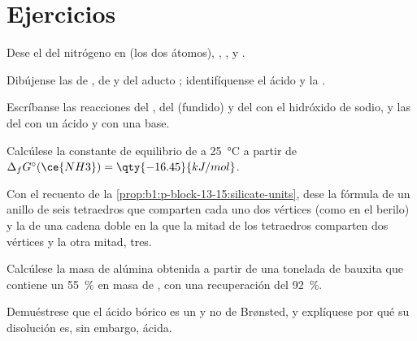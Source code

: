 \section{Ejercicios}

\begin{exercise}[$\star$]\label{exo:b1:p-block-13-15:1}
Dese el  del nitrógeno en  (los dos
átomos), , ,  y .
\end{exercise}

\begin{exercise}[$\star$]\label{exo:b1:p-block-13-15:2}
Dibújense las  de , de  y del aducto
; identifíquense el ácido y la .
\end{exercise}

\begin{exercise}[$\star$]\label{exo:b1:p-block-13-15:3}
Escríbanse las reacciones del , del  (fundido) y del
 con el hidróxido de sodio, y las del  con un ácido y
con una base.
\end{exercise}

\begin{exercise}[$\star$]\label{exo:b1:p-block-13-15:4}
Calcúlese la constante de equilibrio de  a
\qty{25}{\celsius} a partir de $\Delta_f G^\circ(\ce{NH3}) =
\qty{-16.45}{kJ/mol}$.
\end{exercise}

\begin{exercise}[$\star\star$]\label{exo:b1:p-block-13-15:5}
Con el recuento de la \cref{prop:b1:p-block-13-15:silicate-units}, dese
la fórmula de un anillo de seis tetraedros que comparten cada uno dos
vértices (como en el berilo) y la de una cadena doble en la que la mitad
de los tetraedros comparten dos vértices y la otra mitad, tres.
\end{exercise}

\begin{exercise}[$\star\star$]\label{exo:b1:p-block-13-15:6}
Calcúlese la masa de alúmina obtenida a partir de una tonelada de
bauxita que contiene un \qty{55}{\percent} en masa de , con
una recuperación del \qty{92}{\percent}.
\end{exercise}

\begin{exercise}[$\star\star$]\label{exo:b1:p-block-13-15:7}
Demuéstrese que el ácido bórico es un  y no de Brønsted, y
explíquese por qué su disolución es, sin embargo, ácida.
\end{exercise}

